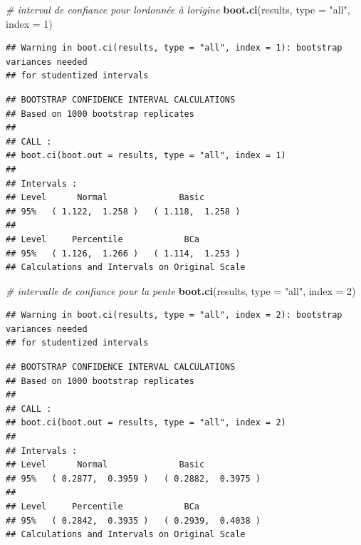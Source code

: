\documentclass[
  12pt,
]{book}
\newenvironment{Shaded}{\begin{snugshade}}{\end{snugshade}}
\newcommand{\CommentTok}[1]{\textcolor[rgb]{0.56,0.35,0.01}{\textit{#1}}}
\newcommand{\DataTypeTok}[1]{\textcolor[rgb]{0.13,0.29,0.53}{#1}}
\newcommand{\DecValTok}[1]{\textcolor[rgb]{0.00,0.00,0.81}{#1}}
\newcommand{\KeywordTok}[1]{\textcolor[rgb]{0.13,0.29,0.53}{\textbf{#1}}}
\newcommand{\NormalTok}[1]{#1}
\newcommand{\StringTok}[1]{\textcolor[rgb]{0.31,0.60,0.02}{#1}}
\begin{document}
\begin{Shaded}
\begin{Highlighting}[]
\CommentTok{\# interval de confiance pour l\textquotesingle{}ordonnée à l\textquotesingle{}origine}
\KeywordTok{boot.ci}\NormalTok{(results, }\DataTypeTok{type =} \StringTok{"all"}\NormalTok{, }\DataTypeTok{index =} \DecValTok{1}\NormalTok{)}
\end{Highlighting}
\end{Shaded}

\begin{verbatim}
## Warning in boot.ci(results, type = "all", index = 1): bootstrap variances needed
## for studentized intervals
\end{verbatim}

\begin{verbatim}
## BOOTSTRAP CONFIDENCE INTERVAL CALCULATIONS
## Based on 1000 bootstrap replicates
## 
## CALL : 
## boot.ci(boot.out = results, type = "all", index = 1)
## 
## Intervals : 
## Level      Normal              Basic         
## 95%   ( 1.122,  1.258 )   ( 1.118,  1.258 )  
## 
## Level     Percentile            BCa          
## 95%   ( 1.126,  1.266 )   ( 1.114,  1.253 )  
## Calculations and Intervals on Original Scale
\end{verbatim}

\begin{Shaded}
\begin{Highlighting}[]
\CommentTok{\# intervalle de confiance pour la pente}
\KeywordTok{boot.ci}\NormalTok{(results, }\DataTypeTok{type =} \StringTok{"all"}\NormalTok{, }\DataTypeTok{index =} \DecValTok{2}\NormalTok{)}
\end{Highlighting}
\end{Shaded}

\begin{verbatim}
## Warning in boot.ci(results, type = "all", index = 2): bootstrap variances needed
## for studentized intervals
\end{verbatim}

\begin{verbatim}
## BOOTSTRAP CONFIDENCE INTERVAL CALCULATIONS
## Based on 1000 bootstrap replicates
## 
## CALL : 
## boot.ci(boot.out = results, type = "all", index = 2)
## 
## Intervals : 
## Level      Normal              Basic         
## 95%   ( 0.2877,  0.3959 )   ( 0.2882,  0.3975 )  
## 
## Level     Percentile            BCa          
## 95%   ( 0.2842,  0.3935 )   ( 0.2939,  0.4038 )  
## Calculations and Intervals on Original Scale
\end{verbatim}
\end{document}

